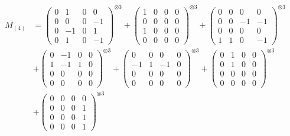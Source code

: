\documentclass{article}
\newcommand{\Mthree}{%
    M_{(4)}
}
\begin{document}
        \newpage
        
        \footnotesize{
        \begin{align}
        \Mthree
        &= \label{Rs16-Rc11-Solution-15-c1} \begin{pmatrix} 0 & 1 & 0 & 0 \\ 0 & 0 & 0 & -1 \\ 0 & -1 & 0 & 1 \\ 0 & 1 & 0 & -1 \end{pmatrix}^{\otimes 3} 
            + \begin{pmatrix} 1 & 0 & 0 & 0 \\ 0 & 0 & 0 & 0 \\ 1 & 0 & 0 & 0 \\ 0 & 0 & 0 & 0 \end{pmatrix}^{\otimes 3} 
            + \begin{pmatrix} 0 & 0 & 0 & 0 \\ 0 & 0 & -1 & -1 \\ 0 & 0 & 0 & 0 \\ 1 & 1 & 0 & -1 \end{pmatrix}^{\otimes 3} \\
        &+ \label{Rs16-Rc11-Solution-15-c4} \begin{pmatrix} 0 & -1 & 0 & 0 \\ 1 & -1 & 1 & 0 \\ 0 & 0 & 0 & 0 \\ 0 & 0 & 0 & 0 \end{pmatrix}^{\otimes 3} 
            + \begin{pmatrix} 0 & 0 & 0 & 0 \\ -1 & 1 & -1 & 0 \\ 0 & 0 & 0 & 0 \\ 0 & 0 & 0 & 0 \end{pmatrix}^{\otimes 3} 
            + \begin{pmatrix} 0 & 1 & 0 & 0 \\ 0 & 1 & 0 & 0 \\ 0 & 0 & 0 & 0 \\ 0 & 0 & 0 & 0 \end{pmatrix}^{\otimes 3} \\
        &+ \label{Rs16-Rc11-Solution-15-c7} \begin{pmatrix} 0 & 0 & 0 & 0 \\ 0 & 0 & 0 & 1 \\ 0 & 0 & 0 & 1 \\ 0 & 0 & 0 & 1 \end{pmatrix}^{\otimes 3} 

\end{align}}
\end{document}
